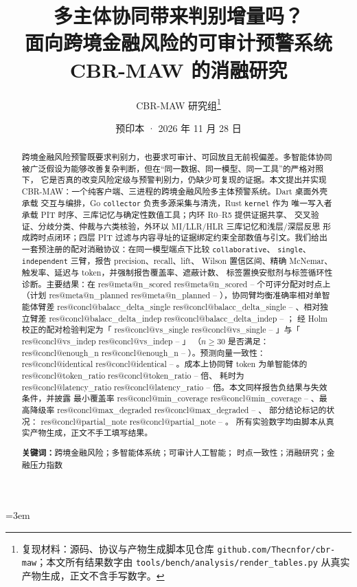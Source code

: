 \documentclass[UTF8,fontset=fandol,11pt,a4paper]{ctexart}
\title{\bfseries 多主体协同带来判别增量吗？\\[6pt]
\large 面向跨境金融风险的可审计预警系统 CBR-MAW 的消融研究}
\author{CBR-MAW 研究组\thanks{复现材料：源码、协议与产物生成脚本见仓库
\texttt{github.com/Thecnfor/cbr-maw}；本文所有结果数字由
\texttt{tools/bench/analysis/render\_tables.py} 从真实产物生成，正文不含手写数字。}}
\date{预印本 · 2026 年 11 月 28 日}
\makeatletter
\newcommand{\RESULT}[2]{%
  \ifcsname res@#1@#2\endcsname
    \csname res@#1@#2\endcsname
  \else
    --%
  \fi}
\makeatother
\begin{document}
\sloppy
\emergencystretch=3em
\maketitle

\begin{abstract}
跨境金融风险预警既要求判别力，也要求可审计、可回放且无前视偏差。多智能体协同
被广泛假设为能够改善复杂判断，但在“同一数据、同一模型、同一工具”的严格对照下，
它是否真的改变风险定级与预警判别力，仍缺少可复现的证据。本文提出并实现
CBR-MAW：一个纯客户端、三进程的跨境金融风险多主体预警系统。Dart 桌面外壳承载
交互与编排，Go \texttt{collector} 负责多源采集与清洗，Rust \texttt{kernel} 作为
唯一写入者承载 PIT 时序、三库记忆与确定性数值工具；内环 R0--R5 提供证据共享、
交叉验证、分歧分类、仲裁与六类核验，外环以 MI/LLR/HLR 三库记忆和浅层/深层反思
形成跨时点闭环；四层 PIT 过滤与内容寻址的证据绑定约束全部数值与引文。我们给出
一套预注册的配对消融协议：在同一模型端点下比较 \texttt{collaborative}、
\texttt{single}、\texttt{independent} 三臂，报告 precision、recall、lift、
Wilson 置信区间、精确 McNemar、触发率、延迟与 token，并强制报告覆盖率、遮蔽计数、
标签置换安慰剂与标签循环性诊断。主要结果：在 \RESULT{meta}{n_scored} 个可评分配对时点上
（计划 \RESULT{meta}{n_planned}），协同臂均衡准确率相对单智能体臂差
\RESULT{concl}{balacc_delta_single}、相对独立臂差 \RESULT{concl}{balacc_delta_indep}；
经 Holm 校正的配对检验判定为「\RESULT{concl}{vs_single}」与「\RESULT{concl}{vs_indep}」
（$n\ge 30$ 是否满足：\RESULT{concl}{enough_n}）。预测向量一致性：
\RESULT{concl}{identical}。成本上协同臂 token 为单智能体的 \RESULT{concl}{token_ratio} 倍、
耗时为 \RESULT{concl}{latency_ratio} 倍。本文同样报告负结果与失效条件，并披露
最小覆盖率 \RESULT{concl}{min_coverage}、最高降级率 \RESULT{concl}{max_degraded}、
部分结论标记的状况：\RESULT{concl}{partial_note}。
所有实验数字均由脚本从真实产物生成，正文不手工填写结果。

\vspace{0.6em}
\noindent\textbf{关键词：}跨境金融风险；多智能体系统；可审计人工智能；
时点一致性；消融研究；金融压力指数
\end{abstract}
\end{document}
